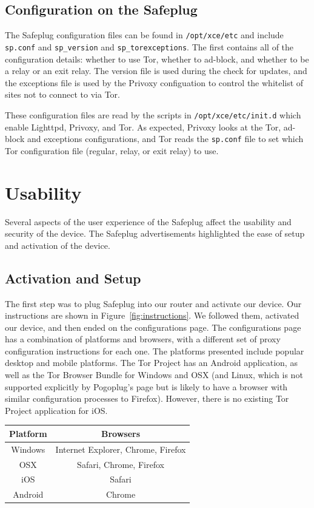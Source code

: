 \documentclass[conference]{IEEEtran}
\begin{document}
\subsection{Configuration on the Safeplug}
\label{spconfig}
The Safeplug configuration files can be found in \verb!/opt/xce/etc! and include \verb!sp.conf! and \verb!sp_version! and \verb!sp_torexceptions!.  The first contains all of the configuration details: whether to use Tor, whether to ad-block, and whether to be a relay or an exit relay. The version file is used during the check for updates, and the exceptions file is used by the Privoxy configuation to control the whitelist of sites not to connect to via Tor.

These configuration files are read by the scripts in \verb!/opt/xce/etc/init.d! which enable Lighttpd, Privoxy, and Tor.  As expected, Privoxy looks at the Tor, ad-block and exceptions configurations, and Tor reads the \verb!sp.conf! file to set which Tor configuration file (regular, relay, or exit relay) to use.

\section{Usability}
Several aspects of the user experience of the Safeplug affect the usability and security of the device.  The Safeplug advertisements highlighted the ease of setup and activation of the device.

\subsection{Activation and Setup}
The first step was to plug Safeplug into our router and activate our device.  Our instructions are shown in Figure~\ref{fig:instructions}.  We followed them, activated our device, and then ended on the configurations page.  The configurations page has a combination of platforms and browsers, with a different set of proxy configuration instructions for each one.  The platforms presented include popular desktop and mobile platforms.  The Tor Project has an Android application, as well as the Tor Browser Bundle for Windows and OSX (and Linux, which is not supported explicitly by Pogoplug's page but is likely to have a browser with similar configuration processes to Firefox).  However, there is no existing Tor Project application for iOS.

\begin{center}
	\begin{tabular}{|c|c|}
	\hline
		Platform & Browsers \\ \hline
		Windows	& Internet Explorer, Chrome, Firefox \\ \hline
		OSX & Safari, Chrome, Firefox \\ \hline
		iOS	& Safari \\ \hline
		Android	& Chrome \\ \hline
	\end{tabular}
\end{center}
\end{document}
